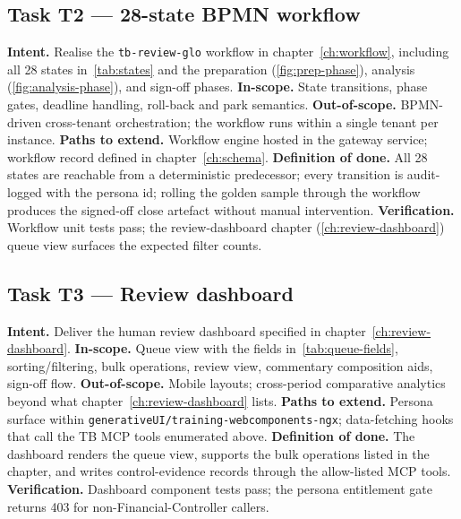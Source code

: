 \documentclass[11pt,a4paper,twoside]{report}
\begin{document}
\subsection*{Task T2 --- 28-state BPMN workflow}
\textbf{Intent.} Realise the \texttt{tb-review-glo} workflow in
chapter~\ref{ch:workflow}, including all 28 states
in~\ref{tab:states} and the preparation
(\ref{fig:prep-phase}), analysis (\ref{fig:analysis-phase}), and
sign-off phases.
\textbf{In-scope.} State transitions, phase gates, deadline handling,
roll-back and park semantics.
\textbf{Out-of-scope.} BPMN-driven cross-tenant orchestration; the
workflow runs within a single tenant per instance.
\textbf{Paths to extend.} Workflow engine hosted in the gateway
service; workflow record defined in chapter~\ref{ch:schema}.
\textbf{Definition of done.} All 28 states are reachable from a
deterministic predecessor; every transition is audit-logged with the
persona id; rolling the golden sample through the workflow produces
the signed-off close artefact without manual intervention.
\textbf{Verification.} Workflow unit tests pass; the review-dashboard
chapter (\ref{ch:review-dashboard}) queue view surfaces the expected
filter counts.

\subsection*{Task T3 --- Review dashboard}
\textbf{Intent.} Deliver the human review dashboard specified in
chapter~\ref{ch:review-dashboard}.
\textbf{In-scope.} Queue view with the fields in~\ref{tab:queue-fields},
sorting/filtering, bulk operations, review view, commentary
composition aids, sign-off flow.
\textbf{Out-of-scope.} Mobile layouts; cross-period comparative
analytics beyond what chapter~\ref{ch:review-dashboard} lists.
\textbf{Paths to extend.} Persona surface within
\texttt{generativeUI/training-webcomponents-ngx}; data-fetching
hooks that call the TB MCP tools enumerated above.
\textbf{Definition of done.} The dashboard renders the queue view,
supports the bulk operations listed in the chapter, and writes
control-evidence records through the allow-listed MCP tools.
\textbf{Verification.} Dashboard component tests pass; the persona
entitlement gate returns 403 for non-Financial-Controller callers.
\end{document}
